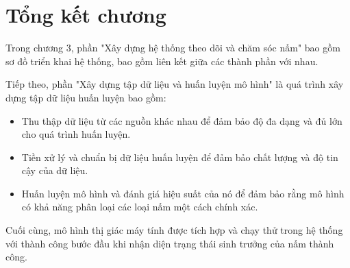 \section{Tổng kết chương}

Trong chương 3, phần "Xây dựng hệ thống theo dõi và chăm sóc nấm" bao gồm sơ đồ triển khai hệ thống, bao gồm liên kết giữa các thành phần với nhau. 

Tiếp theo, phần "Xây dựng tập dữ liệu và huấn luyện mô hình" là quá trình xây dựng tập dữ liệu huấn luyện bao gồm:
\begin{itemize}
    \item Thu thập dữ liệu từ các nguồn khác nhau để đảm bảo độ đa dạng và đủ lớn cho quá trình huấn luyện.
    \item Tiền xử lý và chuẩn bị dữ liệu huấn luyện để đảm bảo chất lượng và độ tin cậy của dữ liệu.
    \item Huấn luyện mô hình và đánh giá hiệu suất của nó để đảm bảo rằng mô hình có khả năng phân loại các loại nấm một cách chính xác.
\end{itemize}

Cuối cùng, mô hình thị giác máy tính được tích hợp và chạy thử trong hệ thống với thành công bước đầu khi nhận diện trạng thái sinh trưởng của nấm thành công.